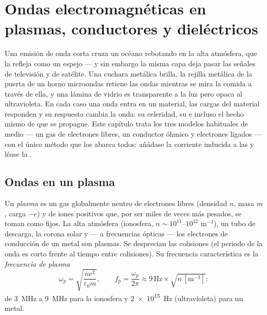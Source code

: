 \chapter{Ondas electromagnéticas en plasmas, conductores y dieléctricos}\label{ch:b2:waves-in-media}

Una emisión de onda corta cruza un océano rebotando en la alta atmósfera,
que la refleja como un espejo --- y sin embargo la misma capa deja pasar
las señales de televisión y de satélite. Una cuchara metálica brilla, la
rejilla metálica de la puerta de un horno microondas retiene las ondas
mientras se mira la comida a través de ella, y una lámina de vidrio es
transparente a la luz pero opaca al ultravioleta. En cada caso una onda
entra en un material, las cargas del material responden y su respuesta
cambia la onda: su celeridad, su  e incluso el hecho mismo de
que se propague. Este capítulo trata los tres modelos habituales de medio
--- un gas de electrones libres, un conductor óhmico y electrones ligados
--- con el único método que los abarca todos: añádase la corriente
inducida a las  y léase la .

\section{Ondas en un plasma}

\begin{definition}\label{def:b2:waves-in-media:plasma}
Un \emph{plasma} es un gas globalmente neutro de electrones libres
(densidad $n$, masa $m$, carga $-e$) y de iones positivos que, por ser
miles de veces más pesados, se toman como fijos. La alta atmósfera
(ionosfera, $n \sim 10^{11}$--$10^{12}$ m$^{-3}$), un tubo de descarga, la
corona solar y --- a frecuencias ópticas --- los electrones de conducción
de un metal son plasmas. Se desprecian las colisiones (el periodo de la
onda es corto frente al tiempo entre colisiones). Su frecuencia
característica es la \emph{frecuencia de plasma}
\[
\omega_p = \sqrt{\frac{ne^2}{\varepsilon_0m}} , \qquad
f_p = \frac{\omega_p}{2\pi} \approx 9\,\text{Hz}\times\sqrt{n\,[\text{m}^{-3}]} :
\]
de \qty{3}{MHz} a \qty{9}{MHz} para la ionosfera y \qty{2e15}{Hz} (ultravioleta) para
un metal.
\end{definition}

